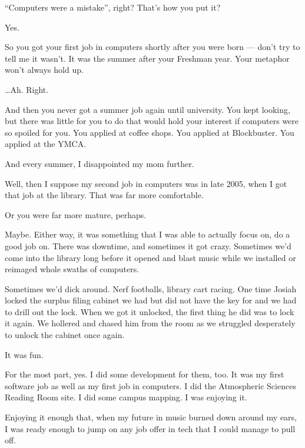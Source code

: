 \begin{paracol}{2}
\begin{leftcolumn}
\begin{ally}
``Computers were a mistake'', right? That's how you put it?
\end{ally}
Yes.

\begin{ally}
So you got your first job in computers shortly after you were born --- don't try to tell me it wasn't. It was the summer after your Freshman year. Your metaphor won't always hold up.
\end{ally}
\ldots{}Ah. Right.

\begin{ally}
And then you never got a summer job again until university. You kept looking, but there was little for you to do that would hold your interest if computers were so spoiled for you. You applied at coffee shops. You applied at Blockbuster. You applied at the YMCA.
\end{ally}
And every summer, I disappointed my mom further.
\newpage

\noindent Well, then I suppose my second job in computers was in late 2005, when I got that job at the library. That was far more comfortable.

\begin{ally}
Or you were far more mature, perhaps.
\end{ally}
Maybe. Either way, it was something that I was able to actually focus on, do a good job on. There was downtime, and sometimes it got crazy. Sometimes we'd come into the library long before it opened and blast music while we installed or reimaged whole swaths of computers.

Sometimes we'd dick around. Nerf footballs, library cart racing. One time Josiah locked the surplus filing cabinet we had but did not have the key for and we had to drill out the lock. When we got it unlocked, the first thing he did was to lock it again. We hollered and chased him from the room as we struggled desperately to unlock the cabinet once again.

\begin{ally}
It was fun.
\end{ally}
For the most part, yes. I did some development for them, too. It was my first software job as well as my first job in computers. I did the Atmospheric Sciences Reading Room site. I did some campus mapping. I was enjoying it.

Enjoying it enough that, when my future in music burned down around my ears, I was ready enough to jump on any job offer in tech that I could manage to pull off.


\end{leftcolumn}
\end{paracol}
